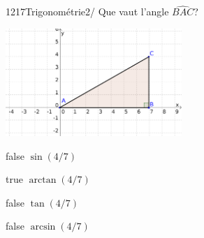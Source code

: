             \begin{question}{1217}{Trigonométrie}{2}{/}
                Que vaut l'angle $\hat{BAC}$?
                \begin{center}
                	\includegraphics[width=0.5\textwidth]{Philippe/Figures_Philippe/trigo_1_1.png}
                \end{center}
            \end{question}
            \begin{reponses}
                \item[false] $\sin(4/7)$
                \item[true] $\arctan(4/7)$
                \item[false] $\tan(4/7)$
                \item[false] $\arcsin(4/7)$
            \end{reponses}
